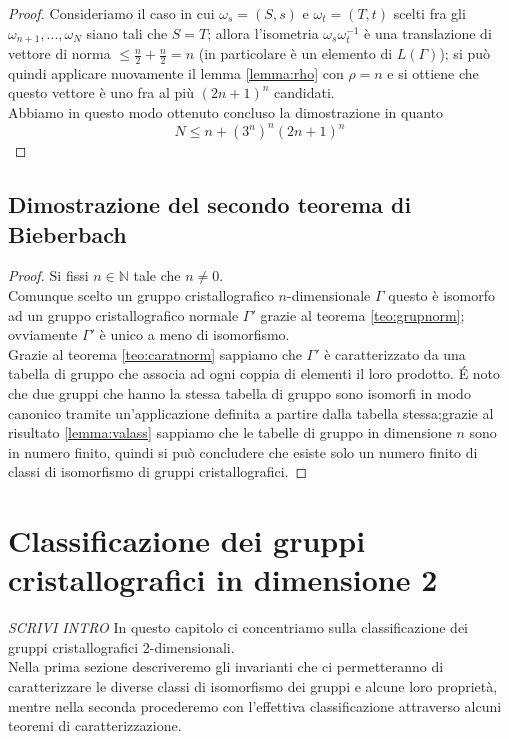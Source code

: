 \documentclass[a4paper,11pt,openright,twoside	]{book}
\begin{document}
\begin{proof}
Consideriamo il caso in cui $\omega_s = (S,s) $ e $\omega_t = (T,t)$ scelti fra gli $\omega_{n+1},...,\omega_N $ siano tali che $S = T$; allora l'isometria $\omega_s \omega_t^{-1}$ è una translazione di vettore di norma $\leq \frac{n}{2} + \frac{n}{2} = n$ (in particolare è un elemento di $L(\Gamma)$);  si può quindi applicare nuovamente il lemma \ref{lemma:rho} con $\rho = n$ e si ottiene che questo vettore è uno fra al più $(2n+1)^n$ candidati. \\
Abbiamo in questo modo ottenuto concluso la dimostrazione in quanto 
\[ N \leq n + (3^n)^n (2n+1)^n\]
\end{proof}
\section{Dimostrazione del secondo teorema di Bieberbach}
\begin{proof}
Si fissi $n \in \mathbb{N}$  tale che $n \neq 0$. \\
Comunque scelto un gruppo cristallografico $n$-dimensionale $\Gamma$ questo è isomorfo ad un gruppo cristallografico normale $\Gamma'$ grazie al teorema  \ref{teo:grupnorm}; ovviamente $\Gamma'$ è unico a meno di isomorfismo. \\
Grazie al teorema \ref{teo:caratnorm} sappiamo che $\Gamma'$ è caratterizzato da una tabella di gruppo che associa ad ogni coppia di elementi il loro prodotto. \'E  noto che due gruppi che hanno la stessa tabella di gruppo sono isomorfi in modo canonico tramite un'applicazione definita a partire dalla tabella stessa;grazie al risultato \ref{lemma:valass} sappiamo che le tabelle di gruppo in dimensione $n$ sono in numero finito, quindi si può concludere che esiste solo un numero finito di classi di isomorfismo di gruppi cristallografici. 
\end{proof}
\chapter{Classificazione dei gruppi cristallografici in dimensione 2}
\emph{SCRIVI INTRO}
In questo capitolo ci concentriamo sulla classificazione dei gruppi cristallografici 2-dimensionali. \\
Nella prima sezione descriveremo gli invarianti che ci permetteranno di caratterizzare le diverse classi di isomorfismo dei gruppi e alcune loro proprietà, mentre nella seconda procederemo con l'effettiva classificazione attraverso alcuni teoremi di caratterizzazione.  \\
\end{document}
